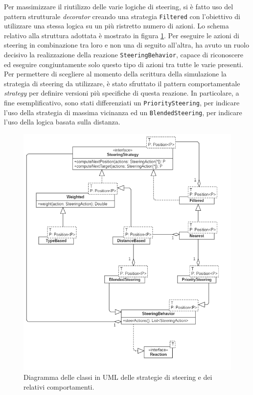 Per massimizzare il riutilizzo delle varie logiche di steering, si è fatto uso del pattern strutturale \textit{decorator} \cite{GoF1995} creando una strategia \texttt{Filtered} con l'obiettivo di utilizzare una stessa logica su un più ristretto numero di azioni. Lo schema relativo alla struttura adottata è mostrato in figura \ref{fig:steering-strategies-uml}. \newline
Per eseguire le azioni di steering in combinazione tra loro e non una di seguito all'altra, ha avuto un ruolo decisivo la realizzazione della reazione \texttt{SteeringBehavior}, capace di riconoscere ed eseguire congiuntamente solo questo tipo di azioni tra tutte le varie presenti. Per permettere di scegliere al momento della scrittura della simulazione la strategia di steering da utilizzare, è stato sfruttato il pattern comportamentale \textit{strategy} per definire versioni più specifiche di questa reazione. \newline 
In particolare, a fine esemplificativo, sono stati differenziati un \texttt{PrioritySteering}, per indicare l'uso della strategia di massima vicinanza ed un \texttt{BlendedSteering}, per indicare l'uso della logica basata sulla distanza.

\begin{figure}
  \centering
  \includegraphics[width=0.75\linewidth]{immagini/uml/steering-strategies.png}
  \caption{Diagramma delle classi in UML delle strategie di steering e dei relativi comportamenti.}
  \label{fig:steering-strategies-uml}
\end{figure}

